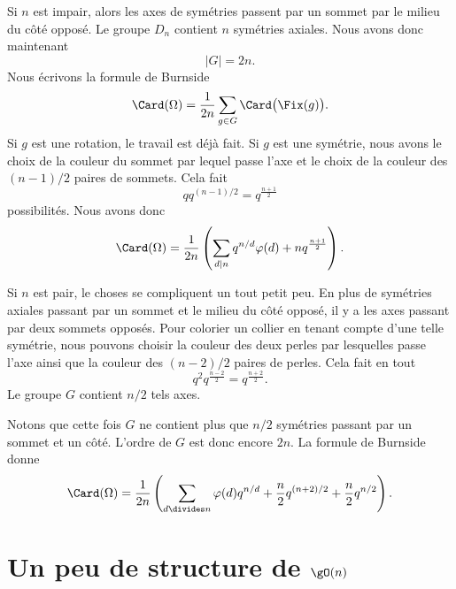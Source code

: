 Si \( n\) est impair, alors les axes de symétries passent par un sommet par le milieu du côté opposé. Le groupe \( D_n\) contient \( n\) symétries axiales. Nous avons donc maintenant
\begin{equation}
    | G |=2n.
\end{equation}
Nous écrivons la formule de Burnside
\begin{equation}
    \Card(\Omega)=\frac{1}{ 2n }\sum_{g\in G}\Card\big( \Fix(g) \big).
\end{equation}
Si \( g\) est une rotation, le travail est déjà fait. Si \( g\) est une symétrie, nous avons le choix de la couleur du sommet par lequel passe l'axe et le choix de la couleur des \( (n-1)/2\) paires de sommets. Cela fait
\begin{equation}
    qq^{(n-1)/2}=q^{\frac{ n+1 }{2}}
\end{equation}
possibilités. Nous avons donc
\begin{equation}
    \Card(\Omega)=\frac{1}{ 2n }\left( \sum_{d|n}q^{n/d}\varphi(d)+nq^{\frac{ n+1 }{2}} \right).
\end{equation}

Si \( n\) est pair, le choses se compliquent un tout petit peu. En plus de symétries axiales passant par un sommet et le milieu du côté opposé, il y a les axes passant par deux sommets opposés. Pour colorier un collier en tenant compte d'une telle symétrie, nous pouvons choisir la couleur des deux perles par lesquelles passe l'axe ainsi que la couleur des \( (n-2)/2\) paires de perles. Cela fait en tout
\begin{equation}
    q^2q^{\frac{ n-2 }{2}}=q^{\frac{ n+2 }{2}}.
\end{equation}
Le groupe \( G\) contient \( n/2\) tels axes.

Notons que cette fois \( G\) ne contient plus que \( n/2\) symétries passant par un sommet et un côté. L'ordre de $G$ est donc encore \( 2n\). La formule de Burnside donne
\begin{equation}
    \Card(\Omega)=\frac{1}{ 2n }\left( \sum_{d\divides n}\varphi(d)q^{n/d}+\frac{ n }{2}q^{(n+2)/2}+\frac{ n }{2}q^{n/2} \right).
\end{equation}

\section{Un peu de structure de \texorpdfstring{\( \gO(n)\)}{O(n)}}

